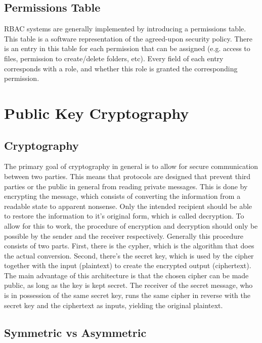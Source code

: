 \subsection{Permissions Table}
\label{subsec:permissions_table}

RBAC systems are generally implemented by introducing a permissions table. This table is a software representation of the agreed-upon security policy. There is an entry in this table for each permission that can be assigned (e.g. access to files, permission to create/delete folders, etc). Every field of each entry corresponds with a role, and whether this role is granted the corresponding permission. 


\section{Public Key Cryptography}
\label{sec:PKC}

\subsection{Cryptography} 
\label{subsec:cryptography}

The primary goal of cryptography in general is to allow for secure communication between two parties. This means that protocols are designed that prevent third parties or the public in general from reading private messages. This is done by encrypting the message, which consists of converting the information from a readable state to apparent nonsense. Only the intended recipient should be able to restore the information to it's original form, which is called decryption. To allow for this to work, the procedure of encryption and decryption should only be possible by the sender and the receiver respectively. Generally this procedure consists of two parts. First, there is the cypher, which is the algorithm that does the actual conversion. Second, there's the secret key, which is used by the cipher together with the input (plaintext) to create the encrypted output (ciphertext). The main advantage of this architecture is that the chosen cipher can be made public, as long as the key is kept secret. The receiver of the secret message, who is in possession of the same secret key, runs the same cipher in reverse with the secret key and the ciphertext as inputs, yielding the original plaintext. \cite{wiki:Cryptography}

\subsection{Symmetric vs Asymmetric}
\label{subsec:symmetric_vs_assymetric}

